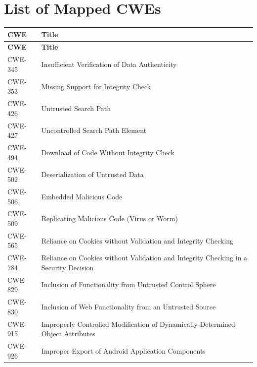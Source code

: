 \documentclass[11pt]{article}
\begin{document}
\section{List of Mapped CWEs}
\renewcommand{\arraystretch}{1.1}
\begin{longtable}{@{}p{2.4cm}p{12.0cm}@{}}
\toprule
\textbf{CWE} & \textbf{Title} \\
\midrule
\endfirsthead
\toprule
\textbf{CWE} & \textbf{Title} \\
\midrule
\endhead
\bottomrule
\endfoot

CWE-345 & Insufficient Verification of Data Authenticity \\
CWE-353 & Missing Support for Integrity Check \\
CWE-426 & Untrusted Search Path \\
CWE-427 & Uncontrolled Search Path Element \\
CWE-494 & Download of Code Without Integrity Check \\
CWE-502 & Deserialization of Untrusted Data \\
CWE-506 & Embedded Malicious Code \\
CWE-509 & Replicating Malicious Code (Virus or Worm) \\
CWE-565 & Reliance on Cookies without Validation and Integrity Checking \\
CWE-784 & Reliance on Cookies without Validation and Integrity Checking in a Security Decision \\
CWE-829 & Inclusion of Functionality from Untrusted Control Sphere \\
CWE-830 & Inclusion of Web Functionality from an Untrusted Source \\
CWE-915 & Improperly Controlled Modification of Dynamically-Determined Object Attributes \\
CWE-926 & Improper Export of Android Application Components \\

\end{longtable}
\end{document}
